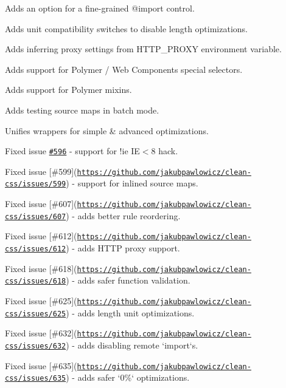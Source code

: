 \begin{DoxyItemize}
\item Adds an option for a fine-\/grained {\ttfamily @import} control.
\item Adds unit compatibility switches to disable length optimizations.
\item Adds inferring proxy settings from H\+T\+T\+P\+\_\+\+P\+R\+O\+XY environment variable.
\item Adds support for Polymer / Web Components special selectors.
\item Adds support for Polymer mixins.
\item Adds testing source maps in batch mode.
\item Unifies wrappers for simple \& advanced optimizations.
\item Fixed issue \href{https://github.com/jakubpawlowicz/clean-css/issues/596}{\tt \#596} -\/ support for !ie IE$<$8 hack.
\item Fixed issue \mbox{[}\#599\mbox{]}(\href{https://github.com/jakubpawlowicz/clean-css/issues/599}{\tt https\+://github.\+com/jakubpawlowicz/clean-\/css/issues/599}) -\/ support for inlined source maps.
\item Fixed issue \mbox{[}\#607\mbox{]}(\href{https://github.com/jakubpawlowicz/clean-css/issues/607}{\tt https\+://github.\+com/jakubpawlowicz/clean-\/css/issues/607}) -\/ adds better rule reordering.
\item Fixed issue \mbox{[}\#612\mbox{]}(\href{https://github.com/jakubpawlowicz/clean-css/issues/612}{\tt https\+://github.\+com/jakubpawlowicz/clean-\/css/issues/612}) -\/ adds H\+T\+TP proxy support.
\item Fixed issue \mbox{[}\#618\mbox{]}(\href{https://github.com/jakubpawlowicz/clean-css/issues/618}{\tt https\+://github.\+com/jakubpawlowicz/clean-\/css/issues/618}) -\/ adds safer function validation.
\item Fixed issue \mbox{[}\#625\mbox{]}(\href{https://github.com/jakubpawlowicz/clean-css/issues/625}{\tt https\+://github.\+com/jakubpawlowicz/clean-\/css/issues/625}) -\/ adds length unit optimizations.
\item Fixed issue \mbox{[}\#632\mbox{]}(\href{https://github.com/jakubpawlowicz/clean-css/issues/632}{\tt https\+://github.\+com/jakubpawlowicz/clean-\/css/issues/632}) -\/ adds disabling remote `import`s.
\item Fixed issue \mbox{[}\#635\mbox{]}(\href{https://github.com/jakubpawlowicz/clean-css/issues/635}{\tt https\+://github.\+com/jakubpawlowicz/clean-\/css/issues/635}) -\/ adds safer `0\%` optimizations.

\end{DoxyItemize}
